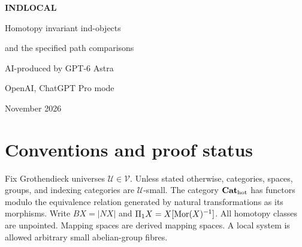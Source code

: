 \documentclass[11pt,a4paper]{article}
\title{INDLOCAL: Homotopy invariant ind-objects\and the specified path comparisons}
\author{AI-produced by GPT-6 Astra\\OpenAI, ChatGPT Pro mode}
\date{14 November 2026}
\theoremstyle{definition}\newtheorem{definition}[theorem]{Definition}
\theoremstyle{remark}\newtheorem{remark}[theorem]{Remark}
\newcommand{\U}{\mathcal U}\newcommand{\V}{\mathcal V}
\begin{document}
\begin{center}
{\LARGE\bfseries INDLOCAL\par}
\medskip
{\Large Homotopy invariant ind-objects\par}
{\Large and the specified path comparisons\par}
\bigskip
AI-produced by GPT-6 Astra\par
OpenAI, ChatGPT Pro mode\par
{} November 2026
\end{center}
\begin{abstract}
This working manuscript records checked proofs, explicit comparisons, and counterexamples for the supplied INDLOCAL problem. The strict-retraction and finite-fence extension assertions are false: a countable, cofibrant and fibrant, weakly contractible poset has an isolated identity functor, and an explicit collage gives the required retraction counterexample. Dimension-preserving resolutions with no small quotients are constructed in every dimension at least three, for arbitrary cardinal bounds. The remaining undecided task is dimension two with an infinite bound, already for a fixed two-sphere. Its proved cases and exact remaining obstructions are recorded. No priority is claimed. Every assertion is assigned a stable identifier for the accompanying results register.
\end{abstract}
\tableofcontents
\section{Conventions and proof status}
Fix Grothendieck universes $\U\in\V$. Unless stated otherwise, categories, spaces, groups, and indexing categories are $\U$-small. The category ${\mathbf{Cat}_{\mathrm{hot}}}$ has functors modulo the equivalence relation generated by natural transformations as its morphisms. Write $BX=|NX|$ and $\Pi_1X=X[\operatorname{Mor}(X)^{-1}]$. All homotopy classes are unpointed. Mapping spaces are derived mapping spaces. A local system is allowed arbitrary small abelian-group fibres.


\end{document}
